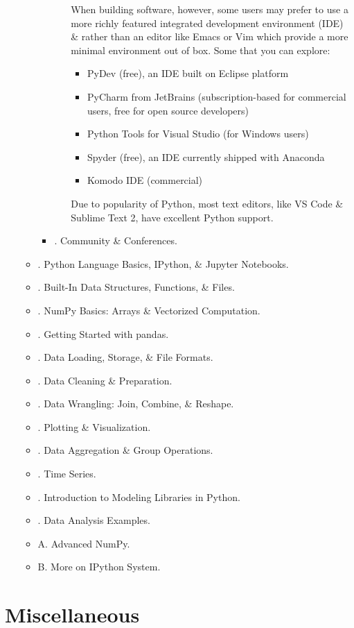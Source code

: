 \documentclass{article}
\begin{document}
\begin{enumerate}
\begin{itemize}
\begin{itemize}
\begin{itemize}
				When building software, however, some users may prefer to use a more richly featured integrated development environment (IDE) \& rather than an editor like Emacs or Vim which provide a more minimal environment out of box. Some that you can explore:
				\begin{itemize}
					\item PyDev (free), an IDE built on Eclipse platform
					\item PyCharm from JetBrains (subscription-based for commercial users, free for open source developers)
					\item Python Tools for Visual Studio (for Windows users)
					\item Spyder (free), an IDE currently shipped with Anaconda
					\item Komodo IDE (commercial)
				\end{itemize}
				Due to popularity of Python, most text editors, like VS Code \& Sublime Text 2, have excellent Python support.
			\end{itemize}
			\item {. Community \& Conferences.}
		\end{itemize}
		\item {. Python Language Basics, IPython, \& Jupyter Notebooks.}
		\item {. Built-In Data Structures, Functions, \& Files.}
		\item {. NumPy Basics: Arrays \& Vectorized Computation.}
		\item {. Getting Started with pandas.}
		\item {. Data Loading, Storage, \& File Formats.}
		\item {. Data Cleaning \& Preparation.}
		\item {. Data Wrangling: Join, Combine, \& Reshape.}
		\item {. Plotting \& Visualization.}
		\item {. Data Aggregation \& Group Operations.}
		\item {. Time Series.}
		\item {. Introduction to Modeling Libraries in Python.}
		\item {. Data Analysis Examples.}
		\item {\sf A. Advanced NumPy.}
		\item {\sf B. More on IPython System.}
	\end{itemize}	
\end{enumerate}


\section{Miscellaneous}


\printbibliography[heading=bibintoc]
	
\end{document}
